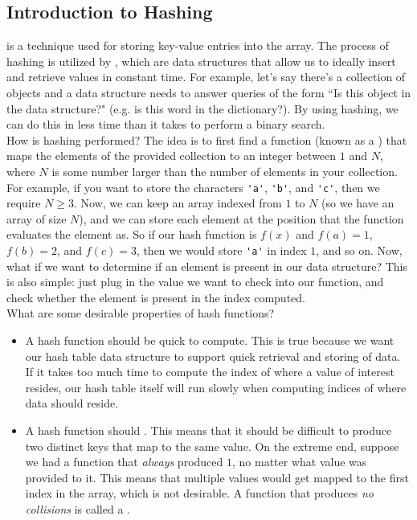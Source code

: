 \subsection{Introduction to Hashing}

 is a technique used for storing key-value entries into the array. The process of hashing is utilized by , which are data structures that allow us to ideally insert and retrieve values in constant time.  For example, let's say there's a collection of objects and a data structure needs to answer queries of the form ``Is this object in the data structure?" (e.g. is this word in the dictionary?).  By using hashing, we can do this in less time than it takes to perform a binary search. \\

How is hashing performed? The idea is to first find a function (known as a ) that maps the elements of the provided collection to an integer between $1$ and $N$, where $N$ is some number larger than the number of elements in your collection. For example, if you want to store the characters \verb!'a'!, \verb!'b'!, and \verb!'c'!, then we require $N \geq 3$. Now, we can keep an array indexed from $1$ to $N$ (so we have an array of size $N$), and we can store each element at the position that the function evaluates the element as. So if our hash function is $f(x)$ and $f(a) = 1$, $f(b) = 2$, and $f(c) = 3$, then we would store \verb!'a'! in index $1$, and so on. Now, what if we want to determine if an element is present in our data structure? This is also simple: just plug in the value we want to check into our function, and check whether the element is present in the index computed. \\

What are some desirable properties of hash functions?
\begin{itemize}
    \item A hash function should be quick to compute. This is true because we want our hash table data structure to support quick retrieval and storing of data. If it takes too much time to compute the index of where a value of interest resides, our hash table itself will run slowly when computing indices of where data should reside.
    \item A hash function should . This means that it should be difficult to produce two distinct keys that map to the same value. On the extreme end, suppose we had a function that \textit{always} produced $1$, no matter what value was provided to it. This means that multiple values would get mapped to the first index in the array, which is not desirable. A function that produces \textit{no collisions} is called a .  
\end{itemize}


